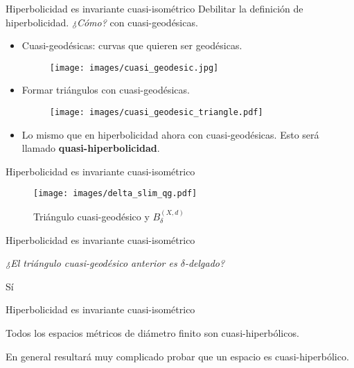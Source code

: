 \documentclass[xcolor=dvipsnames,aspectratio=159]{beamer}
\theoremstyle{largebreak}
\begin{document}
\begin{frame}{Hiperbolicidad es invariante cuasi-isométrico}
    Debilitar la definición de hiperbolicidad.
    \textit{¿Cómo?}
    \pause con cuasi-geodésicas.
    \pause
    \begin{itemize}
        \item Cuasi-geodésicas: curvas que quieren ser geodésicas.
        \begin{figure}
            \begin{center}
                \texttt{[image: images/cuasi\_geodesic.jpg]}
            \end{center}
        \end{figure}
        \pause
        \item Formar triángulos con cuasi-geodésicas.
        \begin{figure}
            \begin{center}
                \texttt{[image: images/cuasi\_geodesic\_triangle.pdf]}
            \end{center}
        \end{figure}
        \pause
        \item Lo mismo que en hiperbolicidad ahora con cuasi-geodésicas. Esto será llamado \textbf{quasi-hiperbolicidad}.
    \end{itemize}
\end{frame}

\begin{frame}{Hiperbolicidad es invariante cuasi-isométrico}
    \begin{figure}
        \begin{center}
            \texttt{[image: images/delta\_slim\_qg.pdf]}
        \end{center}
        \caption{Triángulo cuasi-geodésico  y $B_\delta^{(X,d)}$}
    \end{figure}
\end{frame}

\begin{frame}{Hiperbolicidad es invariante cuasi-isométrico}
    \begin{center}
        \Large \textit{¿El triángulo cuasi-geodésico anterior es $\delta$-delgado?}
        \pause

        \hfill\break

        Sí
    \end{center}    
\end{frame}

\begin{frame}{Hiperbolicidad es invariante cuasi-isométrico}
    \begin{exa}
        Todos los espacios métricos de diámetro finito son cuasi-hiperbólicos.
    \end{exa}

    \pause

    \begin{center}
        En general resultará muy complicado probar que un espacio es cuasi-hiperbólico.
    \end{center}

\end{frame}
\end{document}
